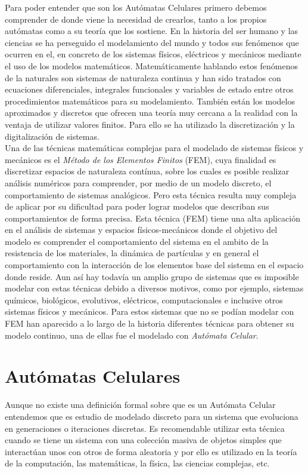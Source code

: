 %

Para poder entender que son los Autómatas Celulares primero debemos comprender de donde viene la necesidad de crearlos, tanto a los propios autómatas como a su teoría que los sostiene. En la historia del ser humano y las ciencias se ha perseguido el modelamiento del mundo y todos sus fenómenos que ocurren en el, en concreto de los sistemas físicos, eléctricos y mecánicos mediante el uso de los modelos matemáticos. Matemáticamente hablando estos fenómenos de la naturales son sistemas de naturaleza continua y han sido tratados con ecuaciones diferenciales, integrales funcionales y variables de estado entre otros procedimientos matemáticos para su modelamiento. También están los modelos aproximados y discretos que ofrecen una teoría muy cercana a la realidad con la ventaja de utilizar valores finitos. Para ello se ha utilizado la discretización y la digitalización de sistemas.\\

Una de las técnicas matemáticas complejas para el modelado de sistemas físicos y mecánicos es el \textit{Método de los Elementos Finitos} (FEM), cuya finalidad es discretizar espacios de naturaleza contínua, sobre los cuales es posible realizar análisis numéricos para comprender, por medio de un modelo discreto, el comportamiento de sistemas analógicos. Pero esta técnica resulta muy compleja de aplicar por su dificultad para poder lograr modelos que describan sus comportamientos de forma precisa. Esta técnica (FEM) tiene una alta aplicación en el análisis de sistemas y espacios físicos-mecánicos donde el objetivo del modelo es comprender el comportamiento del sistema en el ambito de la resistencia de los materiales, la dinámica de partículas y en general el comportamiento con la interacción  de los elementos base del sistema en el espacio donde reside.
Aun así hay todavía un amplio grupo de sistemas que es imposible modelar con estas técnicas debido a diversos motivos, como por ejemplo, sistemas químicos, biológicos, evolutivos, eléctricos, computacionales e inclusive otros sistemas físicos y mecánicos. Para estos sistemas que no se podían modelar con FEM han aparecido a lo largo de la historia diferentes técnicas para obtener su modelo continuo, una de ellas fue el modelado con \textit{Autómata Celular}.




\section{Autómatas Celulares}
Aunque no existe una definición formal sobre que es un Autómata Celular entendemos que es estudio de modelado discreto para un sistema que evoluciona en generaciones o iteraciones discretas. Es recomendable utilizar esta técnica cuando se tiene un sistema con una colección masiva de objetos simples que interactúan unos con otros de forma aleatoria y por ello es utilizado en la teoría de la computación, las matemáticas, la física, las ciencias complejas, etc. \\

